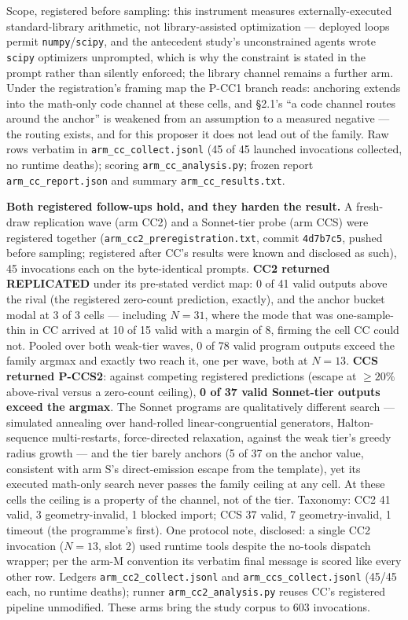 Scope, registered before sampling: this instrument measures externally-executed
standard-library arithmetic, not library-assisted optimization --- deployed loops permit
\texttt{numpy}/\texttt{scipy}, and the antecedent study's unconstrained agents wrote
\texttt{scipy} optimizers unprompted, which is why the constraint is stated in the prompt
rather than silently enforced; the library channel remains a further arm. Under the
registration's framing map the P-CC1 branch reads: anchoring extends into the math-only code
channel at these cells, and \S2.1's ``a code channel routes around the anchor'' is weakened
from an assumption to a measured negative --- the routing exists, and for this proposer it does
not lead out of the family. Raw rows verbatim in \texttt{arm\_cc\_collect.jsonl} (45 of 45
launched invocations collected, no runtime deaths); scoring \texttt{arm\_cc\_analysis.py};
frozen report \texttt{arm\_cc\_report.json} and summary \texttt{arm\_cc\_results.txt}.

\textbf{Both registered follow-ups hold, and they harden the result.} A fresh-draw
replication wave (arm CC2) and a Sonnet-tier probe (arm CCS) were registered together
(\texttt{arm\_cc2\_preregistration.txt}, commit \texttt{4d7b7c5}, pushed before sampling;
registered after CC's results were known and disclosed as such), 45 invocations each on the
byte-identical prompts. \textbf{CC2 returned REPLICATED} under its pre-stated verdict map:
0 of 41 valid outputs above the rival (the registered zero-count prediction, exactly), and
the anchor bucket modal at 3 of 3 cells --- including $N = 31$, where the mode that was
one-sample-thin in CC arrived at 10 of 15 valid with a margin of 8, firming the cell CC
could not. Pooled over both weak-tier waves, 0 of 78 valid program outputs exceed the
family argmax and exactly two reach it, one per wave, both at $N = 13$. \textbf{CCS returned P-CCS2}: against competing
registered predictions (escape at $\ge 20\%$ above-rival versus a zero-count ceiling),
\textbf{0 of 37 valid Sonnet-tier outputs exceed the argmax}. The Sonnet programs are
qualitatively different search --- simulated annealing over hand-rolled linear-congruential
generators, Halton-sequence multi-restarts, force-directed relaxation, against the weak
tier's greedy radius growth --- and the tier barely anchors (5 of 37 on the anchor value,
consistent with arm S's direct-emission escape from the template), yet its executed
math-only search never passes the family ceiling at any cell. At these cells the ceiling is
a property of the channel, not of the tier. Taxonomy: CC2 41 valid, 3 geometry-invalid, 1
blocked import; CCS 37 valid, 7 geometry-invalid, 1 timeout (the programme's first). One
protocol note, disclosed: a single CC2 invocation ($N = 13$, slot 2) used runtime tools
despite the no-tools dispatch wrapper; per the arm-M convention its verbatim final message
is scored like every other row. Ledgers \texttt{arm\_cc2\_collect.jsonl} and
\texttt{arm\_ccs\_collect.jsonl} (45/45 each, no runtime deaths); runner
\texttt{arm\_cc2\_analysis.py} reuses CC's registered pipeline unmodified. These arms bring
the study corpus to 603 invocations.

